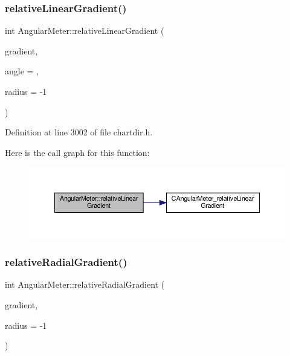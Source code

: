 \subsubsection{\texorpdfstring{relative\+Linear\+Gradient()}{relativeLinearGradient()}}
{\footnotesize\ttfamily int Angular\+Meter\+::relative\+Linear\+Gradient (\begin{DoxyParamCaption}\item[{\hyperlink{class_double_array}{Double\+Array}}]{gradient,  }\item[{double}]{angle = {},  }\item[{double}]{radius = {\ttfamily -\/1} }\end{DoxyParamCaption})\hspace{0.3cm}{\ttfamily [inline]}}



Definition at line 3002 of file chartdir.\+h.

Here is the call graph for this function\+:
\nopagebreak
\begin{figure}[H]
\begin{center}
\leavevmode
\includegraphics[width=350pt]{class_angular_meter_a454bd094af77f76a8e1b55ce180a686c_cgraph}
\end{center}
\end{figure}
\mbox{\label{class_angular_meter_a3f2a73796ea3c4aba359042a810b0339}} 
\subsubsection{\texorpdfstring{relative\+Radial\+Gradient()}{relativeRadialGradient()}}
{\footnotesize\ttfamily int Angular\+Meter\+::relative\+Radial\+Gradient (\begin{DoxyParamCaption}\item[{\hyperlink{class_double_array}{Double\+Array}}]{gradient,  }\item[{double}]{radius = {\ttfamily -\/1} }\end{DoxyParamCaption})\hspace{0.3cm}{\ttfamily [inline]}}



